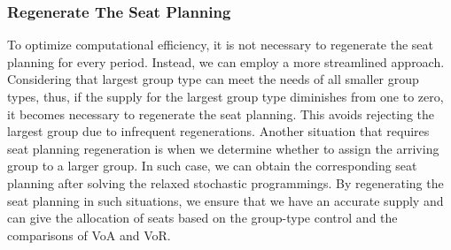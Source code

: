 \subsubsection{Regenerate The Seat Planning}

To optimize computational efficiency, it is not necessary to regenerate the seat planning for every period. Instead, we can employ a more streamlined approach. Considering that largest group type can meet the needs of all smaller group types, thus, if the supply for the largest group type diminishes from one to zero, it becomes necessary to regenerate the seat planning. This avoids rejecting the largest group due to infrequent regenerations. Another situation that requires seat planning regeneration is when we determine whether to assign the arriving group to a larger group. In such case, we can obtain the corresponding seat planning after solving the relaxed stochastic programmings. By regenerating the seat planning in such situations, we ensure that we have an accurate supply and can give the allocation of seats based on the group-type control and the comparisons of VoA and VoR.




